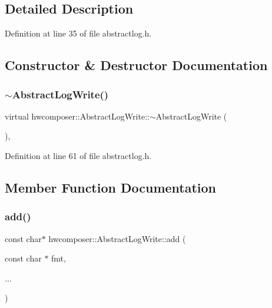 \subsection{Detailed Description}


Definition at line 35 of file abstractlog.\+h.



\subsection{Constructor \& Destructor Documentation}
\mbox{\label{classhwcomposer_1_1AbstractLogWrite_af4ffd5e02ff4ab0793240f277a977490}} 
\subsubsection{\texorpdfstring{$\sim$\+Abstract\+Log\+Write()}{~AbstractLogWrite()}}
{\footnotesize\ttfamily virtual hwcomposer\+::\+Abstract\+Log\+Write\+::$\sim$\+Abstract\+Log\+Write (\begin{DoxyParamCaption}{ }\end{DoxyParamCaption})\hspace{0.3cm}{\ttfamily [inline]}, {\ttfamily [virtual]}}



Definition at line 61 of file abstractlog.\+h.


\begin{DoxyCode}{0}
\end{DoxyCode}


\subsection{Member Function Documentation}
\mbox{\label{classhwcomposer_1_1AbstractLogWrite_a20e581518ad33452f943f249baa1a9f8}} 
\subsubsection{\texorpdfstring{add()}{add()}}
{\footnotesize\ttfamily const char$\ast$ hwcomposer\+::\+Abstract\+Log\+Write\+::add (\begin{DoxyParamCaption}\item[{const char $\ast$}]{fmt,  }\item[{}]{... }\end{DoxyParamCaption})\hspace{0.3cm}{\ttfamily [inline]}}



